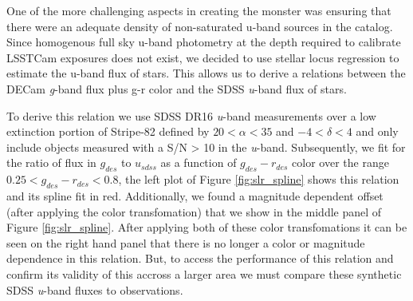 One of the more challenging aspects in creating the monster was ensuring that there were an adequate density of non-saturated u-band sources in the catalog. 
Since homogenous full sky u-band photometry at the depth required to calibrate LSSTCam exposures does not exist, we decided to use stellar locus regression to estimate the u-band flux of stars.
This allows us to derive a relations between the DECam \textit{g}-band flux plus g-r color and the SDSS \textit{u}-band flux of stars. 

To derive this relation we use SDSS DR16 \textit{u}-band measurements over a low extinction portion of Stripe-82 defined by $20 < \alpha < 35$ and $-4 < \delta < 4$ and only include objects measured with a S/N > 10 in the \textit{u}-band. 
Subsequently, we fit for the ratio of flux in $g_{des}$ to $u_{sdss}$ as a function of $g_{des}-r_{des}$ color over the range $0.25 <  g_{des}-r_{des} < 0.8$, the left plot of Figure \ref{fig:slr_spline} shows this relation and its spline fit in red. 
Additionally, we found a magnitude dependent offset (after applying the color transfomation) that we show in the middle panel of Figure \ref{fig:slr_spline}. 
After applying both of these color transfomations it can be seen on the right hand panel that there is no longer a color or magnitude dependence in this relation. 
But, to access the performance of this relation and confirm its validity of this accross a larger area we must compare these synthetic SDSS \textit{u}-band fluxes to observations.

